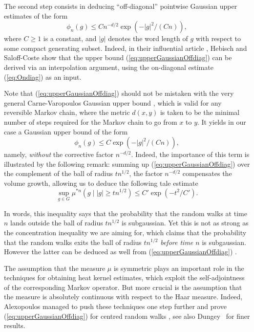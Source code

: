 \documentclass[11pt,leqno]{article}
\theoremstyle{plain}
\theoremstyle{definition}
\theoremstyle{remark}
\numberwithin{equation}{section}
\begin{document}
The second step consists in deducing ``off-diagonal'' pointwise Gaussian upper estimates of the form 
\begin{equation}\label{eq:upperGaussianOffdiag}
\phi_n(g)\leq Cn^{-d/2}\exp\left(-|g|^2/(Cn)\right),
\end{equation}
where $C\geq 1$ is a constant, and $|g|$ denotes the word length of $g$ with respect to some compact generating subset. Indeed, in their influential article \cite{HebishSaloff}, Hebisch and Saloff-Coste show that the upper bound (\ref{eq:upperGaussianOffdiag})  can be derived via an interpolation argument, using the on-diagonal estimate (\ref{eq:Ondiag}) as an input. 

Note that (\ref{eq:upperGaussianOffdiag}) should not be mistaken with the very general Carne-Varopoulos Gaussian upper bound \cite{Varo85,Carne}, which is valid for any reversible Markov chain, where the metric $d(x,y)$ is taken to be the minimal number of steps  required for the Markov chain to go from $x$ to $y$. It yields in our case a Gaussian upper bound of the form
\[\phi_n(g)\leq C\exp\left(-|g|^2/(Cn)\right),\]
namely, {\it without} the corrective factor $n^{-d/2}$. Indeed, the importance of this term is illustrated by the following remark: summing up (\ref{eq:upperGaussianOffdiag}) over the complement of the ball of radius $tn^{1/2}$, the factor $n^{-d/2}$ compensates the volume growth, allowing us to deduce the following tale estimate
\begin{equation}\label{eq:concentration}
\sup_{g\in G}\mu^{*n}(g\mid |g|\geq tn^{1/2})\leq C'\exp\left(-t^2/C'\right).
\end{equation}

In words, this inequality says that the probability that the random walks at time $n$ lands outside the ball of radius $tn^{1/2}$ is subgaussian. Yet this is not as strong as the concentration inequality we are aiming for, which claims that the probability that the random walks exits the ball of radius $tn^{1/2}$ {\it before time $n$} is subgaussian. However the latter can be deduced as well from (\ref{eq:upperGaussianOffdiag}) \cite[Lemma 13.3]{Alexopoulos}.

The assumption that the measure $\mu$ is symmetric plays an important role in the techniques for obtaining heat kernel estimates, which exploit the self-adjointness of the corresponding Markov operator. But more crucial is the assumption that the measure is absolutely continuous with respect to the Haar measure. Indeed,  Alexopoulos managed to push these techniques one step further and prove (\ref{eq:upperGaussianOffdiag}) for centred random walks \cite{Alexopoulos, AlexopoulosLC}, see also Dungey~\cite{Dungey} for finer results.
\end{document}
